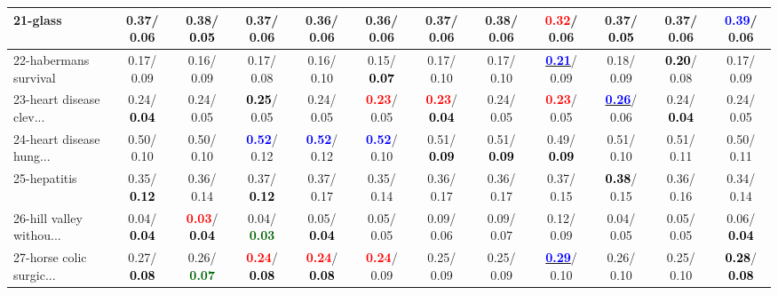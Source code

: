 \begin{table}[h]
\begin{center}
{\begin{tabular}{lc|c|c|c|c|c|c|c|c|c|c}
21-glass &   0.37/  0.06 &   0.38/\textcolor{black}{\textbf{  0.05}} &   0.37/  0.06 &   0.36/  0.06 &   0.36/  0.06 &   0.37/  0.06 &   0.38/  0.06 & \textcolor{red}{\textbf{  0.32}}/  0.06 &   0.37/\textcolor{black}{\textbf{  0.05}} &   0.37/  0.06 & \textcolor{blue}{\textbf{  0.39}}/  0.06 \\ \hline
22-habermans survival &   0.17/  0.09 &   0.16/  0.09 &   0.17/  0.08 &   0.16/  0.10 &   0.15/\textcolor{black}{\textbf{  0.07}} &   0.17/  0.10 &   0.17/  0.10 & \underline{\textcolor{blue}{\textbf{  0.21}}}/  0.09 &   0.18/  0.09 & \textcolor{black}{\textbf{  0.20}}/  0.08 &   0.17/  0.09 \\
23-heart disease clev... &   0.24/\textcolor{black}{\textbf{  0.04}} &   0.24/  0.05 & \textcolor{black}{\textbf{  0.25}}/  0.05 &   0.24/  0.05 & \textcolor{red}{\textbf{  0.23}}/  0.05 & \textcolor{red}{\textbf{  0.23}}/\textcolor{black}{\textbf{  0.04}} &   0.24/  0.05 & \textcolor{red}{\textbf{  0.23}}/  0.05 & \underline{\textcolor{blue}{\textbf{  0.26}}}/  0.06 &   0.24/\textcolor{black}{\textbf{  0.04}} &   0.24/  0.05 \\
24-heart disease hung... &   0.50/  0.10 &   0.50/  0.10 & \textcolor{blue}{\textbf{  0.52}}/  0.12 & \textcolor{blue}{\textbf{  0.52}}/  0.12 & \textcolor{blue}{\textbf{  0.52}}/  0.10 &   0.51/\textcolor{black}{\textbf{  0.09}} &   0.51/\textcolor{black}{\textbf{  0.09}} &   0.49/\textcolor{black}{\textbf{  0.09}} &   0.51/  0.10 &   0.51/  0.11 &   0.50/  0.11 \\
25-hepatitis &   0.35/\textcolor{black}{\textbf{  0.12}} &   0.36/  0.14 &   0.37/\textcolor{black}{\textbf{  0.12}} &   0.37/  0.17 &   0.35/  0.14 &   0.36/  0.17 &   0.36/  0.17 &   0.37/  0.15 & \textcolor{black}{\textbf{  0.38}}/  0.15 &   0.36/  0.16 &   0.34/  0.14 \\
26-hill valley withou... &   0.04/\textcolor{black}{\textbf{  0.04}} & \textcolor{red}{\textbf{  0.03}}/\textcolor{black}{\textbf{  0.04}} &   0.04/\textcolor{darkgreen}{\textbf{  0.03}} &   0.05/\textcolor{black}{\textbf{  0.04}} &   0.05/  0.05 &   0.09/  0.06 &   0.09/  0.07 &   0.12/  0.09 &   0.04/  0.05 &   0.05/  0.05 &   0.06/\textcolor{black}{\textbf{  0.04}} \\
27-horse colic surgic... &   0.27/\textcolor{black}{\textbf{  0.08}} &   0.26/\textcolor{darkgreen}{\textbf{  0.07}} & \textcolor{red}{\textbf{  0.24}}/\textcolor{black}{\textbf{  0.08}} & \textcolor{red}{\textbf{  0.24}}/\textcolor{black}{\textbf{  0.08}} & \textcolor{red}{\textbf{  0.24}}/  0.09 &   0.25/  0.09 &   0.25/  0.09 & \underline{\textcolor{blue}{\textbf{  0.29}}}/  0.10 &   0.26/  0.10 &   0.25/  0.10 & \textcolor{black}{\textbf{  0.28}}/\textcolor{black}{\textbf{  0.08}} \\

\end{tabular}}
\end{center}
\end{table}

